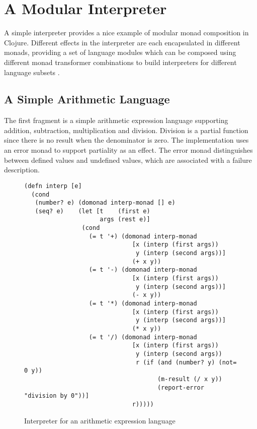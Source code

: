 \documentclass[natbib,10pt]{sigplanconf}
\begin{document}
\section{A Modular Interpreter}

A simple interpreter provides a nice example of modular monad
composition in Clojure.  Different effects in the interpreter are each
encapsulated in different monads, providing a set of language modules
which can be composed using different monad transformer combinations
to build interpreters for different language subsets
\citep{modular-interpreters}.

\subsection {A Simple Arithmetic Language}

The first fragment is a simple arithmetic expression language
supporting addition, subtraction, multiplication and division.
Division is a partial function since there is no result when the
denominator is zero.  The implementation uses an error monad to
support partiality as an effect.  The error monad distinguishes
between defined values and undefined values, which are associated
with a failure description.

\begin{figure*}
\begin{center}
\begin{verbatim}
(defn interp [e]
  (cond
   (number? e) (domonad interp-monad [] e)
   (seq? e)    (let [t    (first e)
                     args (rest e)]
                (cond
                  (= t '+) (domonad interp-monad
                              [x (interp (first args))
                               y (interp (second args))]
                              (+ x y))
                  (= t '-) (domonad interp-monad
                              [x (interp (first args))
                               y (interp (second args))]
                              (- x y))
                  (= t '*) (domonad interp-monad
                              [x (interp (first args))
                               y (interp (second args))]
                              (* x y))
                  (= t '/) (domonad interp-monad
                              [x (interp (first args))
                               y (interp (second args))
                               r (if (and (number? y) (not= 0 y))
                                     (m-result (/ x y))
                                     (report-error "division by 0"))]
                              r)))))
\end{verbatim}
\end{center}
\caption{Interpreter for an arithmetic expression language}
\label{fig-interp-0}
\end{figure*}
\end{document}
